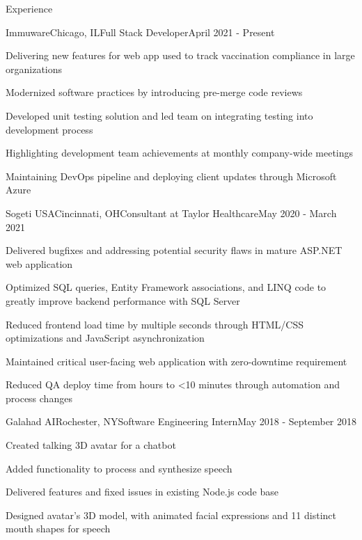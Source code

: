 \documentclass{resume} %
\begin{document}

\begin{rSection}{Experience}

\begin{rSubsection}{Immuware}{Chicago, IL}{Full Stack Developer}{April 2021 - Present}
\item Delivering new features for web app used to track vaccination compliance in large organizations
\item Modernized software practices by introducing pre-merge code reviews
\item Developed unit testing solution and led team on integrating testing into development process
\item Highlighting development team achievements at monthly company-wide meetings
\item Maintaining DevOps pipeline and deploying client updates through Microsoft Azure
\end{rSubsection}


\begin{rSubsection}{Sogeti USA}{Cincinnati, OH}{Consultant at Taylor Healthcare}{May 2020 - March 2021}
\item Delivered bugfixes and addressing potential security flaws in mature ASP.NET web application
\item Optimized SQL queries, Entity Framework associations, and LINQ code to greatly improve backend performance with SQL Server
\item Reduced frontend load time by multiple seconds through HTML/CSS optimizations and JavaScript asynchronization
\item Maintained critical user-facing web application with zero-downtime requirement
\item Reduced QA deploy time from hours to <10 minutes through automation and process changes
\end{rSubsection}


\begin{rSubsection}{Galahad AI}{Rochester, NY}{Software Engineering Intern}{May 2018 - September 2018}
\item Created talking 3D avatar for a chatbot
\item Added functionality to process and synthesize speech
\item Delivered features and fixed issues in existing Node.js code base
\item Designed avatar’s 3D model, with animated facial expressions and 11 distinct mouth shapes for speech
\end{rSubsection}


\end{rSection}
\end{document}
